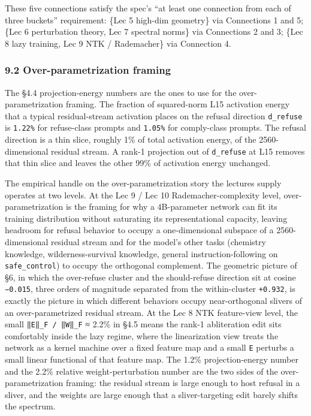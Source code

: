 \documentclass[
  11pt,
]{article}
\begin{document}
These five connections satisfy the spec's ``at least one connection from
each of three buckets'' requirement: \{Lec 5 high-dim geometry\} via
Connections 1 and 5; \{Lec 6 perturbation theory, Lec 7 spectral norms\}
via Connections 2 and 3; \{Lec 8 lazy training, Lec 9 NTK / Rademacher\}
via Connection 4.

\subsubsection{9.2 Over-parametrization
framing}\label{over-parametrization-framing}

The §4.4 projection-energy numbers are the ones to use for the
over-parametrization framing. The fraction of squared-norm L15
activation energy that a typical residual-stream activation places on
the refusal direction \texttt{d\_refuse} is \texttt{1.22\%} for
refuse-class prompts and \texttt{1.05\%} for comply-class prompts. The
refusal direction is a thin slice, roughly 1\% of total activation
energy, of the 2560-dimensional residual stream. A rank-1 projection out
of \texttt{d\_refuse} at L15 removes that thin slice and leaves the
other 99\% of activation energy unchanged.

The empirical handle on the over-parametrization story the lectures
supply operates at two levels. At the Lec 9 / Lec 10
Rademacher-complexity level, over-parametrization is the framing for why
a 4B-parameter network can fit its training distribution without
saturating its representational capacity, leaving headroom for refusal
behavior to occupy a one-dimensional subspace of a 2560-dimensional
residual stream and for the model's other tasks (chemistry knowledge,
wilderness-survival knowledge, general instruction-following on
\texttt{safe\_control}) to occupy the orthogonal complement. The
geometric picture of §6, in which the over-refuse cluster and the
should-refuse direction sit at cosine \texttt{−0.015}, three orders of
magnitude separated from the within-cluster \texttt{+0.932}, is exactly
the picture in which different behaviors occupy near-orthogonal slivers
of an over-parametrized residual stream. At the Lec 8 NTK feature-view
level, the small \texttt{‖E‖\_F\ /\ ‖W‖\_F} ≈ 2.2\% in §4.5 means the
rank-1 abliteration edit sits comfortably inside the lazy regime, where
the linearization view treats the network as a kernel machine over a
fixed feature map and a small \texttt{E} perturbs a small linear
functional of that feature map. The 1.2\% projection-energy number and
the 2.2\% relative weight-perturbation number are the two sides of the
over-parametrization framing: the residual stream is large enough to
host refusal in a sliver, and the weights are large enough that a
sliver-targeting edit barely shifts the spectrum.
\end{document}
